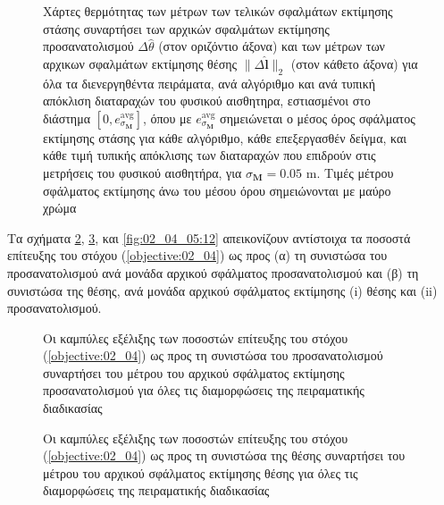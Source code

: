 \begin{figure}[!h]\vspace{2cm}\hspace{0.5cm}
  
  \vspace{1cm}
  \caption{\small Χάρτες θερμότητας των μέτρων των τελικών σφαλμάτων εκτίμησης
           στάσης συναρτήσει των αρχικών σφαλμάτων εκτίμησης προσανατολισμού
           $\Delta\hat{\theta}$ (στον οριζόντιο άξονα) και των μέτρων των
           αρχικων σφαλμάτων εκτίμησης θέσης $\|\Delta \hat{\bm{l}}\|_2$ (στον
           κάθετο άξονα) για όλα τα διενεργηθέντα πειράματα, ανά αλγόριθμο και
           ανά τυπική απόκλιση διαταραχών του φυσικού αισθητηρα, εστιασμένοι
           στο διάστημα $[0, e_{\sigma_{\bm{M}}}^{\text{avg}}]$, όπου με
           $e_{\sigma_{\bm{M}}}^{\text{avg}}$ σημειώνεται ο μέσος όρος
           σφάλματος εκτίμησης στάσης για κάθε αλγόριθμο, κάθε επεξεργασθέν
           δείγμα, και κάθε τιμή τυπικής απόκλισης των διαταραχών που επιδρούν
           στις μετρήσεις του φυσικού αισθητήρα, για $\sigma_{\bm{M}} = 0.05$
           m.  Τιμές μέτρου σφάλματος εκτίμησης άνω του μέσου όρου σημειώνονται
           με μαύρο χρώμα}
  \label{fig:02_04_05:09}
\end{figure}


Τα σχήματα \ref{fig:02_04_05:10}, \ref{fig:02_04_05:11}, και
\ref{fig:02_04_05:12} απεικονίζουν αντίστοιχα τα ποσοστά επίτευξης του στόχου
(\ref{objective:02_04}) ως προς (α) τη συνιστώσα του προσανατολισμού ανά μονάδα
αρχικού σφάλματος προσανατολισμού και (β) τη συνιστώσα της θέσης, ανά μονάδα
αρχικού σφάλματος εκτίμησης (i) θέσης και (ii) προσανατολισμού.

\begin{figure}[!h]\centering
  \vspace{2cm}
  
  \vspace{1.5cm}
  \caption{\small Οι καμπύλες εξέλιξης των ποσοστών επίτευξης του στόχου
           (\ref{objective:02_04}) ως προς τη συνιστώσα του προσανατολισμού
           συναρτήσει του μέτρου του αρχικού σφάλματος εκτίμησης
           προσανατολισμού για όλες τις διαμορφώσεις της πειραματικής
           διαδικασίας}
  \label{fig:02_04_05:10}
\end{figure}

\begin{figure}[!h]\centering
  \vspace{2cm}
  
  \vspace{1.5cm}
  \caption{\small Οι καμπύλες εξέλιξης των ποσοστών επίτευξης του στόχου
           (\ref{objective:02_04}) ως προς τη συνιστώσα της θέσης
           συναρτήσει του μέτρου του αρχικού σφάλματος εκτίμησης
           θέσης για όλες τις διαμορφώσεις της πειραματικής διαδικασίας}
  \label{fig:02_04_05:11}
\end{figure}



